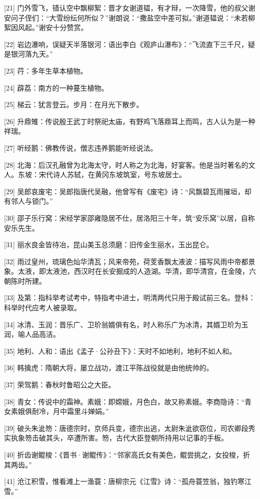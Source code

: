 \documentclass[12pt,UTF8]{ctexbook}
\begin{document}
[21] 门外雪飞，错认空中飘柳絮：晋才女谢道韫，有才辩，一次降雪，他的叔父谢安问子侄们：“大雪纷纭何所似？”谢朗说：“撒盐空中差可拟。”谢道韫说：“未若柳絮因风起。”谢安十分赞赏。

[22] 岩边瀑响，误疑天半落银河：语出李白《观庐山瀑布》：“飞流直下三千尺，疑是银河落九天。”

[23] 荇：多年生草本植物。

[24] 薜荔：南方的一种蔓生植物。

[25] 梯云：犹言登云。步月：在月光下散步。

[26] 升鼎雉：传说殷王武丁时祭祀太庙，有野鸡飞落鼎耳上而鸣，古人认为是一种祥瑞。

[27] 听经鹅：佛教传说，僧志违养鹅能听经说法。

[28] 北海：后汉孔融曾为北海太守，时人称之为北海，好宴客。他是当时著名的文人。东坡：宋代诗人苏轼，在黄冈东坡筑室，号东坡居士。

[29] 吴郎哀废宅：吴郎指唐代吴融，他曾写有《废宅》诗：“风飘碧瓦雨摧垣，却有邻人与锁门。”

[30] 邵子乐行窝：宋经学家邵雍隐居不仕，居洛阳三十年，筑“安乐窝”以居，自称安乐先生。

[31] 丽水良金皆待冶，昆山美玉总须磨：旧传金生丽水，玉出昆仑。

[32] 雨过皇州，琉璃色灿华清瓦；风来帝苑，荷芰香飘太液波：描写风雨中帝都景象。太液，即太液池，西汉时在长安掘成的人造湖。华清，即华清宫，在金陵，六朝陈时所建。

[33] 及第：指科举考试考中，特指考中进士，明清两代只用于殿试前三名。登科：科举时代应考人被录取。

[34] 冰清、玉润：晋乐广、卫玠翁婿俱有名，时人称乐广为冰清，其婿卫玠为玉润，喻人品高洁。

[35] 地利、人和：语出《孟子·公孙丑下》：天时不如地利，地利不如人和。

[36] 韩擒虎：隋朝大将，屡立战功，渡江平陈战役就是由他统帅的。

[37] 荣驾鹅：春秋时鲁昭公之大臣。

[38] 青女：传说中的霜神。素娥：即嫦娥，月色白，故又称素娥。李商隐诗：“青女素娥俱耐冷，月中霜里斗婵娟。”

[39] 破头朱泚笏：唐德宗时，京师兵变，德宗出逃，太尉朱泚欲窃位，司农卿段秀实执象笏击破其头，卒遭所害。笏，古代大臣登朝所持用以记事的手板。

[40] 折齿谢鲲梭：《晋书·谢鲲传》：“邻家高氏女有美色，鲲尝挑之，女投梭，折其两齿。”

[41] 沧江积雪，惟看滩上一渔蓑：唐柳宗元《江雪》诗：“孤舟蓑笠翁，独钓寒江雪。”
\end{document}
